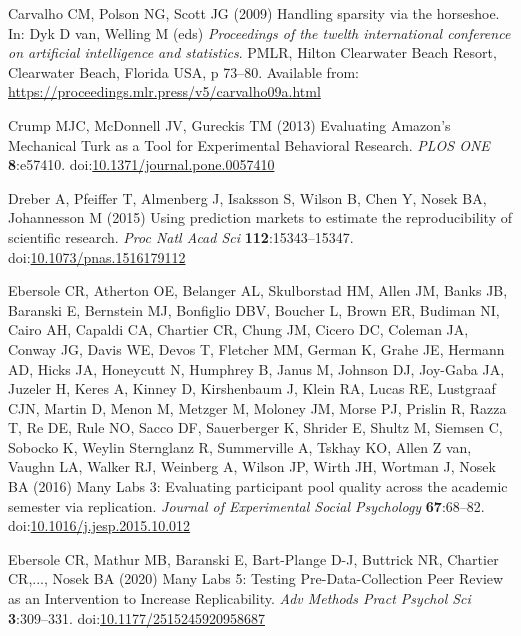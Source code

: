 \documentclass[
  english,
  a4paper,
]{article}
\newlength{\cslhangindent}
\newlength{\cslentryspacingunit} %
\newenvironment{CSLReferences}[2] %
 {%
  \setlength{\parindent}{0pt}
  \ifodd #1
  \let\oldpar\par
  \def\par{\hangindent=\cslhangindent\oldpar}
  \fi
  \setlength{\parskip}{#2\cslentryspacingunit}
 }%
 {}
\begin{document}
\begin{CSLReferences}{1}{0}
\leavevmode{}%
Carvalho CM, Polson NG, Scott JG (2009) Handling sparsity via the horseshoe. In: Dyk D van, Welling M (eds) \emph{Proceedings of the twelth international conference on artificial intelligence and statistics}. PMLR, Hilton Clearwater Beach Resort, Clearwater Beach, Florida USA, p 73--80. Available from: \url{https://proceedings.mlr.press/v5/carvalho09a.html}

\leavevmode{}%
Crump MJC, McDonnell JV, Gureckis TM (2013) Evaluating {Amazon}'s {Mechanical Turk} as a {Tool} for {Experimental Behavioral Research}. \emph{PLOS ONE} \textbf{8}:e57410. doi:\href{https://doi.org/10.1371/journal.pone.0057410}{10.1371/journal.pone.0057410}

\leavevmode{}%
Dreber A, Pfeiffer T, Almenberg J, Isaksson S, Wilson B, Chen Y, Nosek BA, Johannesson M (2015) Using prediction markets to estimate the reproducibility of scientific research. \emph{Proc Natl Acad Sci} \textbf{112}:15343--15347. doi:\href{https://doi.org/10.1073/pnas.1516179112}{10.1073/pnas.1516179112}

\leavevmode{}%
Ebersole CR, Atherton OE, Belanger AL, Skulborstad HM, Allen JM, Banks JB, Baranski E, Bernstein MJ, Bonfiglio DBV, Boucher L, Brown ER, Budiman NI, Cairo AH, Capaldi CA, Chartier CR, Chung JM, Cicero DC, Coleman JA, Conway JG, Davis WE, Devos T, Fletcher MM, German K, Grahe JE, Hermann AD, Hicks JA, Honeycutt N, Humphrey B, Janus M, Johnson DJ, Joy-Gaba JA, Juzeler H, Keres A, Kinney D, Kirshenbaum J, Klein RA, Lucas RE, Lustgraaf CJN, Martin D, Menon M, Metzger M, Moloney JM, Morse PJ, Prislin R, Razza T, Re DE, Rule NO, Sacco DF, Sauerberger K, Shrider E, Shultz M, Siemsen C, Sobocko K, Weylin Sternglanz R, Summerville A, Tskhay KO, Allen Z van, Vaughn LA, Walker RJ, Weinberg A, Wilson JP, Wirth JH, Wortman J, Nosek BA (2016) Many {Labs} 3: {Evaluating} participant pool quality across the academic semester via replication. \emph{Journal of Experimental Social Psychology} \textbf{67}:68--82. doi:\href{https://doi.org/10.1016/j.jesp.2015.10.012}{10.1016/j.jesp.2015.10.012}

\leavevmode{}%
Ebersole CR, Mathur MB, Baranski E, Bart-Plange D-J, Buttrick NR, Chartier CR,..., Nosek BA (2020) Many {Labs} 5: {Testing Pre-Data-Collection Peer Review} as an {Intervention} to {Increase Replicability}. \emph{Adv Methods Pract Psychol Sci} \textbf{3}:309--331. doi:\href{https://doi.org/10.1177/2515245920958687}{10.1177/2515245920958687}


\end{CSLReferences}
\end{document}
